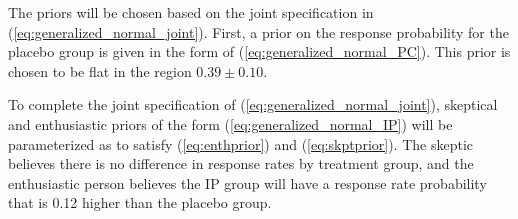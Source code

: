 \documentclass[12pt]{article}
\begin{document}
The priors will be chosen based on the joint specification in (\ref{eq:generalized_normal_joint}). First, a prior on the response probability for the placebo group is given in the form of (\ref{eq:generalized_normal_PC}). This prior is chosen to be flat in the region $0.39\pm 0.10$.

To complete the joint specification of (\ref{eq:generalized_normal_joint}), skeptical and enthusiastic priors of the form (\ref{eq:generalized_normal_IP}) will be parameterized as to satisfy (\ref{eq:enthprior}) and (\ref{eq:skptprior}). The skeptic believes there is no difference in response rates by treatment group, and the enthusiastic person believes the IP group will have a response rate probability that is 0.12 higher than the placebo group. 

%



%				
\end{document}
